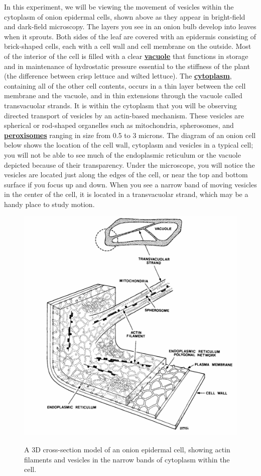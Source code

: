 \documentclass{../lab}
\begin{document}
In this experiment, we will be viewing the movement of vesicles within the cytoplasm of onion epidermal cells, shown above as they appear in bright-field and dark-field microscopy. The layers you see in an onion bulb develop into leaves when it sprouts. Both sides of the leaf are covered with an epidermis consisting of brick-shaped cells, each with a cell wall and cell membrane on the outside. Most of the interior of the cell is filled with a clear \href{http://en.wikipedia.org/wiki/Vacuole}{\textbf{vacuole}} that functions in storage and in maintenance of hydrostatic pressure essential to the stiffness of the plant (the difference between crisp lettuce and wilted lettuce). The \href{http://en.wikipedia.org/wiki/Cytoplasm}{\textbf{cytoplasm}}, containing all of the other cell contents, occurs in a thin layer between the cell membrane and the vacuole, and in thin extensions through the vacuole called transvacuolar strands. It is within the cytoplasm that you will be observing directed transport of vesicles by an actin-based mechanism. These vesicles are spherical or rod-shaped organelles such as mitochondria, spherosomes, and \href{http://en.wikipedia.org/wiki/Peroxisome}{\textbf{peroxisomes}} ranging in size from 0.5 to 3 microns. The diagram of an onion cell below shows the location of the cell wall, cytoplasm and vesicles in a typical cell; you will not be able to see much of the endoplasmic reticulum or the vacuole depicted because of their transparency. Under the microscope, you will notice the vesicles are located just along the edges of the cell, or near the top and bottom surface if you focus up and down. When you see a narrow band of moving vesicles in the center of the cell, it is located in a transvacuolar strand, which may be a handy place to study motion.

\begin{figure}[h]
    \centering
    \href{http://experimentationlab.berkeley.edu/sites/default/files/images/500px-BMC_OnionStucture.gif}{\includegraphics[width=0.5\linewidth]{images/500px-BMC_OnionStucture.png}}
    \caption{A 3D cross-section model of an onion epidermal cell, showing actin filaments and vesicles in the narrow bands of cytoplasm within the cell.}
    \label{fig:500px-BMC_OnionStucture}
\end{figure}
\end{document}
